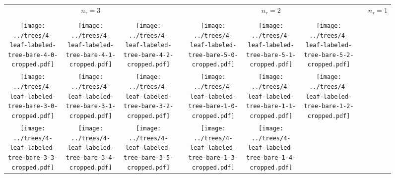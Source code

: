 \documentclass[border=10pt,varwidth=30cm]{standalone}
\newcommand{\ndivs}{\ensuremath{n_{\tau}}\xspace}
\newcommand{\pltwidth}{0.1}
\newcommand{\catspace}{0.015}
\begin{document}
\begin{figure}
    \setlength\arrayrulewidth{2pt}
    \centering
    \begin{tabular}{@{}|ccc|cccccc@{}}
        \multicolumn{3}{c}{\Huge $\ndivs = 3$} & & \multicolumn{3}{c}{\Huge $\ndivs = 2$} & & {\Huge $\ndivs = 1$} \\[2.5ex]
        \cline{1-3}
        &
        &
        &
        &
        &
        &
        \\
        \texttt{[image: ../trees/4-leaf-labeled-tree-bare-4-0-cropped.pdf]}
        &
        \texttt{[image: ../trees/4-leaf-labeled-tree-bare-4-1-cropped.pdf]}
        &
        \texttt{[image: ../trees/4-leaf-labeled-tree-bare-4-2-cropped.pdf]}
        &
        \hspace{\catspace\textwidth}
        &
        \texttt{[image: ../trees/4-leaf-labeled-tree-bare-5-0-cropped.pdf]}
        &
        \texttt{[image: ../trees/4-leaf-labeled-tree-bare-5-1-cropped.pdf]}
        &
        \texttt{[image: ../trees/4-leaf-labeled-tree-bare-5-2-cropped.pdf]}
        &
        \hspace{\catspace\textwidth}
        &
        \\
        \texttt{[image: ../trees/4-leaf-labeled-tree-bare-3-0-cropped.pdf]}
        &
        \texttt{[image: ../trees/4-leaf-labeled-tree-bare-3-1-cropped.pdf]}
        &
        \texttt{[image: ../trees/4-leaf-labeled-tree-bare-3-2-cropped.pdf]}
        &
        &
        \texttt{[image: ../trees/4-leaf-labeled-tree-bare-1-0-cropped.pdf]}
        &
        \texttt{[image: ../trees/4-leaf-labeled-tree-bare-1-1-cropped.pdf]}
        &
        \texttt{[image: ../trees/4-leaf-labeled-tree-bare-1-2-cropped.pdf]}
        &
        &
        \\
        \texttt{[image: ../trees/4-leaf-labeled-tree-bare-3-3-cropped.pdf]}
        &
        \texttt{[image: ../trees/4-leaf-labeled-tree-bare-3-4-cropped.pdf]}
        &
        \texttt{[image: ../trees/4-leaf-labeled-tree-bare-3-5-cropped.pdf]}
        &
        &
        \texttt{[image: ../trees/4-leaf-labeled-tree-bare-1-3-cropped.pdf]}
        &
        \texttt{[image: ../trees/4-leaf-labeled-tree-bare-1-4-cropped.pdf]}

\end{tabular}
\end{figure}
\end{document}
